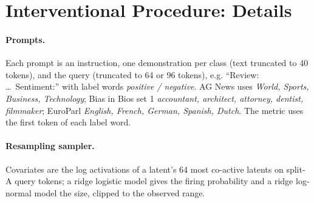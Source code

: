 \begin{table}[H]
\centering
\small
\setlength{\tabcolsep}{3pt}
\caption{Repairs on SST-2 ($p = 2{,}048$, 54 planted conditions, 30 replicates, fixed penalty
$\lambda = 0.02$). Hurdle recovers 77\% of the power gap to the control. Equicorrelated Gaussian
knockoffs do not breach at this conservative penalty; under the cross-validated penalty Gaussian
knockoffs do (Table~\ref{tab:breach}). Breaches: cells above $q$ before correction (none after BY for any
method). Power excludes the 6 cells with $k = 10$, $q = 0.05$, where Knockoff+ has power 0 by arithmetic; on
all 54 cells, e-value splitting (.655) beats hurdle (.594).}
\label{tab:sst2repairs}
\end{table}

\section{Interventional Procedure: Details}
\label{app:stage5}

\paragraph{Prompts.} Each prompt is an instruction, one demonstration per class (text truncated to
40 tokens), and the query (truncated to 64 or 96 tokens), e.g. ``Review: \ldots\ Sentiment:'' with
label words \emph{positive / negative}. AG News uses \emph{World, Sports, Business, Technology}; Bias
in Bios set 1 \emph{accountant, architect, attorney, dentist, filmmaker}; EuroParl \emph{English,
French, German, Spanish, Dutch}. The metric uses the first token of each label word.

\paragraph{Resampling sampler.} Covariates are the log activations of a latent's 64 most co-active latents on split-A
query tokens; a ridge logistic model gives the firing probability and a ridge log-normal model the size, clipped to the observed range.

